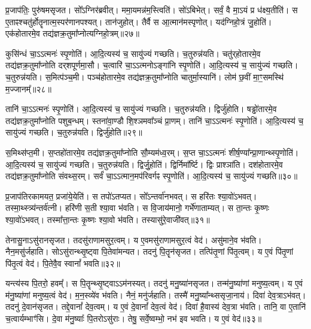प्र॒जा\-प॑तिः॒ पुरु॑षम\-सृजत।
सो᳚ऽग्निर॑ब्रवीत्।
ममा॒यमन्न॑\-म॒स्त्विति॑।
सो॑ऽबिभेत्।
सर्वं॒ वै मा॒ऽयं प्र ध॑क्ष्य॒तीति॑।
स ए॒ताꣴ\-श्चतु॑र्\mbox{}होतॄनात्म॒स्पर॑णानपश्यत्।
तान॑जुहोत्।
तैर्वै स आ॒त्मान॑\-मस्पृणोत्।
यद॑ग्निहो॒त्रं जु॒होति॑।
एक॑होतारमे॒व तद्य॑ज्ञ\-क्र॒तुमा᳚प्नोत्यग्नि\-हो॒त्रम्॥२७॥\ip

कुसि॑न्धं चा॒ऽऽत्मनः॑ स्पृ॒णोति॑।
आ॒दि॒त्यस्य॑ च॒ सायु॑ज्यं गच्छति।
च॒तुरुन्न॑यति।
चतु॑र्‌\mbox{}होतारमे॒व तद्य॑ज्ञक्र॒तुमा᳚प्नोति दर्‌\mbox{}श\-पूर्ण\-मा॒सौ।
च॒त्वारि॑ चा॒ऽऽत्मनो\-ऽङ्गा॑नि स्पृ॒णोति॑।
आ॒दि॒त्यस्य॑ च॒ सायु॑ज्यं गच्छति।
च॒तुरुन्न॑यति।
स॒मित्प॑ञ्च॒मी।
पञ्च॑होतारमे॒व तद्य॑ज्ञ\-क्र॒तुमा᳚प्नोति चातुर्मा॒स्यानि॑।
लोम॑ छ॒वीं मा॒ꣳ॒समस्थि॑ म॒ज्जानम्᳚॥२८॥\ip

तानि॑ चा॒ऽऽत्मनः॑ स्पृ॒णोति॑।
आ॒दि॒त्यस्य॑ च॒ सायु॑ज्यं गच्छति।
च॒तुरुन्न॑यति।
द्विर्जु॑होति।
षड्ढो॑तारमे॒व तद्य॑ज्ञक्र॒तुमा᳚प्नोति पशुब॒न्धम्।
स्तना॑वा॒ण्डौ शि॒श्ञमवा᳚ञ्चं प्रा॒णम्।
तानि॑ चा॒ऽऽत्मनः॑ स्पृ॒णोति॑।
आ॒दि॒त्यस्य॑ च॒ सायु॑ज्यं गच्छति।
च॒तुरुन्न॑यति।
द्विर्जु॑होति॥२९॥\ip

स॒मिथ्स॑प्त॒मी।
स॒प्तहो॑तारमे॒व तद्य॑ज्ञक्र॒तुमा᳚प्नोति सौ॒म्यम॑ध्व॒रम्।
स॒प्त चा॒ऽऽत्मनः॑ शीर्\mbox{}ष॒ण्या᳚न्प्रा॒णान्थ्स्पृ॒णोति॑।
आ॒दि॒त्यस्य॑ च॒ सायु॑ज्यं गच्छति।
च॒तुरुन्न॑यति।
द्विर्जु॒होति॑।
द्विर्निमा᳚र्ष्टि।
द्विः प्राश्ञा॑ति।
दश॑होतारमे॒व तद्य॑ज्ञक्र॒तुमा᳚प्नोति संवथ्स॒रम्।
सर्वं॑ चा॒\-ऽ\-ऽ\-त्मान॒\-मप॑रि\-वर्गꣴ स्पृ॒णोति॑।
आ॒दि॒त्यस्य॑ च॒ सायु॑ज्यं गच्छति॥३०॥\ip\anuvakamend[अ॒ग्नि॒हो॒त्रं म॒ज्जान॒न्द्विर्जु॑हो॒त्यप॑रिवर्गꣴ स्पृ॒णोत्येकं॑ च]

प्र॒जा\-प॑तिरकामयत॒ प्रजा॑ये॒येति॑।
स तपो॑\-ऽतप्यत।
सो᳚ऽन्तर्वा॑नभवत्।
स हरि॑तः श्या॒वो॑\-ऽभवत्।
तस्मा॒थ्स्त्र्य॑न्तर्व॑त्नी।
हरि॑णी स॒ती श्या॒वा भ॑वति।
स वि॒जाय॑मानो॒ गर्भे॑णाताम्यत्।
स ता॒न्तः कृ॒ष्णः श्या॒वो॑\-ऽभवत्।
तस्मा᳚त्ता॒न्तः कृ॒ष्णः श्या॒वो भ॑वति।
तस्यासु॑रे॒वाजी॑वत्॥३१॥\ip

तेनासु॒ना\-ऽसु॑रान\-सृजत।
तदसु॑राणा\-मसुर॒\-त्वम्।
य ए॒वम\-सु॑राणा\-मसुर॒\-त्वं वेद॑।
असु॑माने॒व भ॑वति।
नैन॒\-मसु॑र्जहाति।
सो\-ऽ\-सु॑रान्थ्सृ॒ष्ट्वा पि॒तेवा॑\-मन्यत।
तदनु॑ पि॒तॄन॑\-सृजत।
तत्पि॑तृ॒णां पि॑तृ॒\-त्वम्।
य ए॒वं पि॑तृ॒णां पि॑तृ॒\-त्वं वेद॑।
पि॒तेवै॒व स्वानां᳚ भवति॥३२॥\ip

यन्त्य॑स्य पि॒तरो॒ हवम्᳚।
स पि॒तॄन्थ्सृ॒ष्ट्वा\-ऽऽम॑नस्यत्।
तदनु॑ मनु॒ष्या॑न\-सृजत।
तन्म॑नु॒ष्या॑णां मनुष्य॒त्वम्।
य ए॒वं म॑नु॒ष्या॑णां मनुष्य॒त्वं वेद॑।
म॒न॒स्व्ये॑व भ॑वति।
नैनं॒ मनु॑र्जहाति।
तस्मै॑ मनु॒ष्या᳚न्थ्ससृजा॒नाय॑।
दिवा॑ देव॒त्रा\-ऽभ॑वत्।
तदनु॑ दे॒वान॑\-सृजत।
तद्दे॒वानां᳚ देव॒त्वम्।
य ए॒वं दे॒वानां᳚ देव॒त्वं वेद॑।
दिवा॑ है॒वास्य॑ देव॒त्रा भ॑वति।
तानि॒ वा ए॒तानि॑ च॒त्वार्यम्भाꣳ॑सि।
दे॒वा म॑नु॒ष्याः᳚ पि॒तरो\-ऽसु॑राः।
तेषु॒ सर्वे॒ष्वम्भो॒ नभ॑ इव भवति।
य ए॒वं वेद॑॥३३॥\ip\anuvakamend[अ॒जी॒व॒थ्स्वानां᳚ भवति दे॒वान॑\-सृजत स॒प्त च॑]

